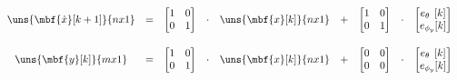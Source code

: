 \documentclass[crop=false,float=true,class=scrreprt]{standalone}
\begin{document}
\vspace{-0em}

\begin{equation}
\label{EQN:controllerDesign:additionalDynamics:trackingSystem:integrator:discrete}
\begin{array}{ccccccccc}
\uns{\mbf{\dot{x}}[k+1]}{n x 1}
& = &
\begin{bmatrix}
1 & 0 \\
0 & 1 \\
\end{bmatrix}
& \cdot &
\uns{\mbf{x}[k]}{n x 1}
& + & 
\begin{bmatrix}
1 & 0 \\
0 & 1 \\
\end{bmatrix}
& \cdot &
\begin{bmatrix}
e_{\theta_{\hphantom{y}}} [k] \\
e_{\phi_{y}}              [k] \\
\end{bmatrix}
\\[+2em]
\uns{\mbf{y}[k]}{m x 1}
& = &
\begin{bmatrix}
1 & 0 \\
0 & 1 \\
\end{bmatrix}
& \cdot &
\uns{\mbf{x}[k]}{n x 1}
& + &
\begin{bmatrix}
0 & 0 \\
0 & 0 \\
\end{bmatrix}
& \cdot &
\begin{bmatrix}
e_{\theta_{\hphantom{y}}} [k] \\
e_{\phi_{y}}              [k] \\
\end{bmatrix}
\end{array}
\end{equation}




\clearpage
\end{document}
